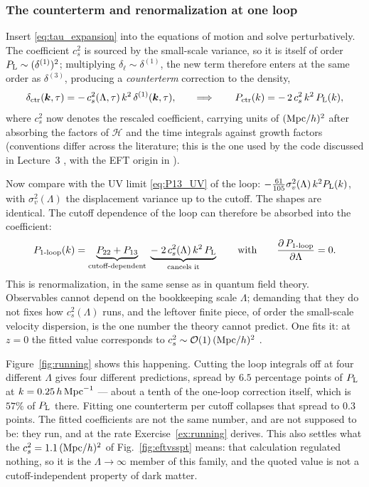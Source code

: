 \documentclass[a4paper,11pt]{article}
\newcommand{\vk}{\bm{k}}
\def\cH{\mathcal{H}}
\def\Plin{P_{\rm L}}
\numberwithin{equation}{section}
\begin{document}
\subsubsection{The counterterm and renormalization at one loop}

Insert \eqref{eq:tau_expansion} into the equations of motion and solve perturbatively. The coefficient $c_s^2$ is sourced by the small-scale variance, so it is itself of order $\Plin \sim (\delta^{(1)})^2$; multiplying $\delta_\ell \sim \delta^{(1)}$, the new term therefore enters at the same order as $\delta^{(3)}$, producing a \emph{counterterm} correction to the density,
\begin{equation}
\delta_{\rm ctr}(\vk,\tau) = -\,c_s^2(\Lambda,\tau)\,k^2\,\delta^{(1)}(\vk,\tau) ,
\qquad\Longrightarrow\qquad
P_{\rm ctr}(k) = -\,2\,c_s^2\,k^2\,\Plin(k) ,
\label{eq:ctr}
\end{equation}
where $c_s^2$ now denotes the rescaled coefficient, carrying units of $({\rm Mpc}/h)^2$ after absorbing the factors of $\cH$ and the time integrals against growth factors (conventions differ across the literature; this is the one used by the code discussed in Lecture~3 \cite{ClassPT2020}, with the EFT origin in \cite{Baumann2010,Carrasco2012}).

Now compare with the UV limit \eqref{eq:P13_UV} of the loop: $-\tfrac{61}{105}\sigma_v^2(\Lambda)\,k^2\Plin(k)$, with $\sigma_v^2(\Lambda)$ the displacement variance up to the cutoff. The shapes are identical. The cutoff dependence of the loop can therefore be absorbed into the coefficient:
\begin{equation}
P_{\rm 1\text{-}loop}(k)
= \underbrace{P_{22} + P_{13}}_{\text{cutoff-dependent}}
\;\underbrace{-\;2\,c_s^2(\Lambda)\,k^2\,\Plin}_{\text{cancels it}}
\qquad\text{with}\qquad
\frac{\partial\,P_{\rm 1\text{-}loop}}{\partial\Lambda} = 0 .
\label{eq:renormalized}
\end{equation}
This is renormalization, in the same sense as in quantum field theory. Observables cannot depend on the bookkeeping scale $\Lambda$; demanding that they do not fixes how $c_s^2(\Lambda)$ runs, and the leftover finite piece, of order the small-scale velocity dispersion, is the one number the theory cannot predict. One fits it: at $z=0$ the fitted value corresponds to $c_s^2 \sim \mathcal{O}(1)\,({\rm Mpc}/h)^2$ \cite{Carrasco2012}.

Figure~\ref{fig:running} shows this happening. Cutting the loop integrals off at four different $\Lambda$ gives four different predictions, spread by $6.5$ percentage points of $\Plin$ at $k=0.25\,h\,{\rm Mpc}^{-1}$ --- about a tenth of the one-loop correction itself, which is $57\%$ of $\Plin$ there. Fitting one counterterm per cutoff collapses that spread to $0.3$ points. The fitted coefficients are not the same number, and are not supposed to be: they run, and at the rate Exercise~\ref{ex:running} derives. This also settles what the $c_s^2 = 1.1\,({\rm Mpc}/h)^2$ of Fig.~\ref{fig:eftvsspt} means: that calculation regulated nothing, so it is the $\Lambda\to\infty$ member of this family, and the quoted value is not a cutoff-independent property of dark matter.
\end{document}
